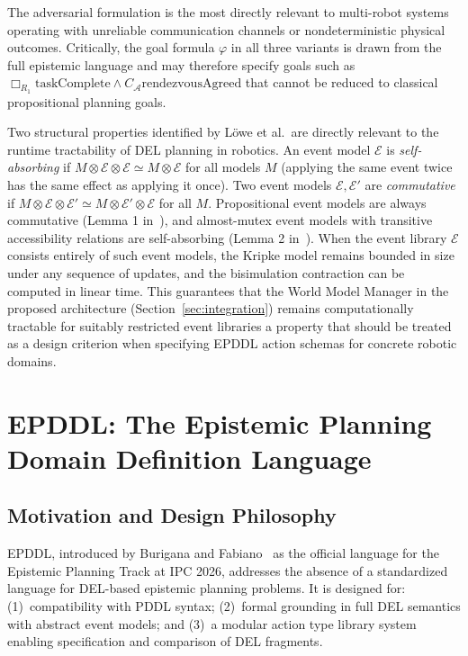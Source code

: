 \documentclass[12pt,a4paper]{article}
\theoremstyle{definition}
\theoremstyle{plain}
\begin{document}
The adversarial formulation is the most directly relevant to multi-robot systems
operating with unreliable communication channels or nondeterministic physical outcomes.
Critically, the goal formula $\varphi$ in all three variants is drawn from the full
epistemic language and may therefore specify goals such as
$\Box_{R_1} \mathrm{taskComplete} \wedge C_{\mathcal{A}} \mathrm{rendezvousAgreed}$
that cannot be reduced to classical propositional planning goals.

Two structural properties identified by L{\"o}we et al.\ are directly relevant to
the runtime tractability of DEL planning in robotics. An event model $\mathcal{E}$ is
\textit{self-absorbing} if $M \otimes \mathcal{E} \otimes \mathcal{E} \simeq M \otimes
\mathcal{E}$ for all models $M$ (applying the same event twice has the same effect as
applying it once). Two event models $\mathcal{E}, \mathcal{E}'$ are \textit{commutative}
if $M \otimes \mathcal{E} \otimes \mathcal{E}' \simeq M \otimes \mathcal{E}' \otimes
\mathcal{E}$ for all $M$. Propositional event models are always commutative (Lemma 1
in~\cite{lowe2010planning}), and almost-mutex event models with transitive accessibility
relations are self-absorbing (Lemma 2 in~\cite{lowe2010planning}). When the event library
$\mathcal{E}$ consists entirely of such event models, the Kripke model remains bounded in
size under any sequence of updates, and the bisimulation contraction can be computed in
linear time. This guarantees that the World Model Manager in the proposed architecture
(Section~\ref{sec:integration}) remains computationally tractable for suitably restricted
event libraries a property that should be treated as a design criterion when specifying
EPDDL action schemas for concrete robotic domains.


\newpage
\section{EPDDL: The Epistemic Planning Domain Definition Language}
\label{sec:epddl}

\subsection{Motivation and Design Philosophy}

EPDDL, introduced by Burigana and Fabiano~\cite{burigana2026epddl} as the official language for
the Epistemic Planning Track at IPC 2026, addresses the absence of a standardized language for
DEL-based epistemic planning problems. It is designed for: (1)~compatibility with PDDL syntax;
(2)~formal grounding in full DEL semantics with abstract event models; and (3)~a modular action
type library system enabling specification and comparison of DEL fragments.
\end{document}
